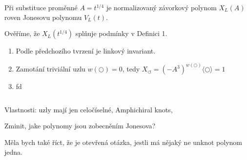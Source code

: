 \begin{veta}\label{t01:6}
Při substituce proměnné $A = t^{1/4}$ je normalizovaný závorkový polynom $X_L(A)$  roven Jonesovu polynomu $V_L(t)$.
\end{veta}
\begin{dukaz}
Ověříme, že $X_L(t^{1/4})$ splňuje podmínky v Definici 1.

\begin{enumerate}
\item
Podle předchozího tvrzení je linkový invariant.
\item
Zamotání triviální uzlu $w( \bigcirc) = 0$, tedy $X_\circlearrowleft = (-A^3)^{w( \bigcirc)} \langle \bigcirc  \rangle = 1$ 
\item
fd
\end{enumerate}
$ $
\end{dukaz}



Vlastnosti:
uzly mají jen celočíselné, Amphichiral knots, 

Zminit, jake polynomy jsou zobecněním Jonesova?

Měla bych také říct, že je otevřená otázka, jestli má nějaký ne unknot polynom jedna.